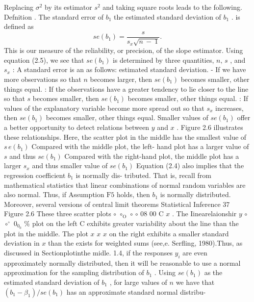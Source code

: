 \documentclass[11pt]{article}
\begin{document}
Replacing \(\sigma^{2}\) by its estimator \(s^{2}\) and taking square roots leads to the following.
 Defnition . The standard error of \(b_{1}\) the estimated standard deviation of \(b_{1}\) .
 is defined as
\[
s e ( b_{1} )=\frac{s} {s_{x} \sqrt{n \mathrm{~}-\mathrm{~} 1}} . \tag{2.5}
\]
This is our measure of the reliability, or precision, of the slope estimator. Using
equation (2.5), we see that \(s e ( b_{1} )\) is determined by three quantities, \(n , \, s\) , and \(s_{x}\) :
A standard error is an as follows:
estimated standard
 deviation. - If we have more observations so that \(n\) becomes larger, then \(s e ( b_{1} )\) becomes
 smaller, other things equal.
: If the observations have a greater tendency to lie closer to the line so that \(s\)
becomes smaller, then \(s e ( b_{1} )\) becomes smaller, other things equal.
: If values of the explanatory variable become more spread out so that \(s_{x}\)
increases, then \(s e ( b_{1} )\) becomes smaller, other things equal.
 Smaller values of \(s e ( b_{1} )\) offer a better opportunity to detect relations between
\(y\) and \(x\) . Figure 2.6 illustrates these relationships. Here, the scatter plot in the
 middle has the smallest value of \(s \, e ( b_{1} )\) Compared with the middle plot, the left-
 hand plot has a larger value of \(s\) and thus \(s e ( b_{1} )\) Compared with the right-hand
 plot, the middle plot has a larger \(s_{x}\) and thus smaller value of \(s e ( b_{1} )\)
Equation (2.4) also implies that the regression coefficient \(b_{1}\) is normally dis-
tributed. That is, recall from mathematical statistics that linear combinations of
normal random variables are also normal. Thus, if Assumption \(\mathrm{F 5}\) holds, then
\(b_{1}\) is normally distributed. Moreover, several versions of central limit theorems
 Statistical Inference 37
Figure 2.6 These
three scatter plots
\(\circ\) \(\circ_{\mathrm{O}}\) \(\circ\) \(\circ\) 08 00 C \(x\) . The
Iinearelaionshir
\(y\)
\(\circ\) \(\circ^{\circ}\) \(0_{0_{0}}\) \% plot on the left
C exhibits greater
variability about the
line than the plot in
the middle. The plot
\(x\) \(x\) \(x\) on the right exhibits a
smaller standard
 deviation in \(x\) than the
exists for weighted sums (see,e. Serfling, 1980).Thus, as discussed in Sectionplotinthe midle.
1.4, if the responses \(y_{i}\) are even approximately normally distributed, then it will
 be reasonable to use a normal approximation for the sampling distribution of
\(b_{1}\) . Using \(s e ( b_{1} )\) as the estimated standard deviation of \(b_{1}\) , for large values of
\(n\) we have that \(\left( b_{1}-\beta_{1} \right) / s e ( b_{1} )\) has an approximate standard normal distribu-
\end{document}

